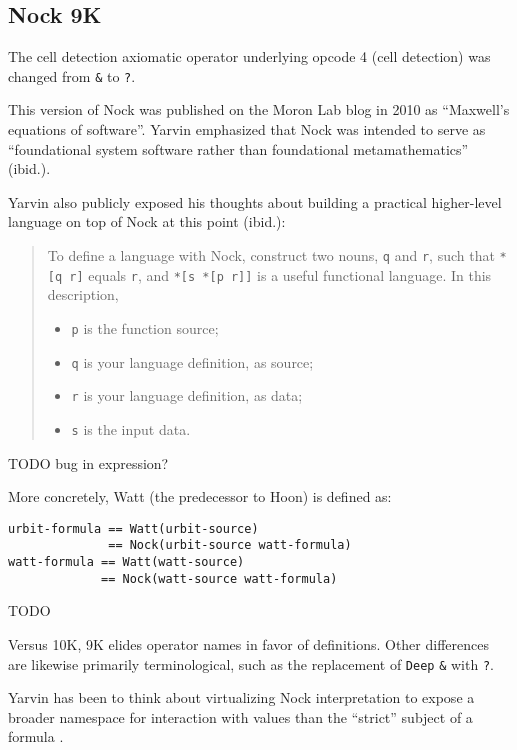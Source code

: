 \documentclass[twoside]{article}
\begin{document}
\subsection{Nock 9K}

The cell detection axiomatic operator underlying opcode 4 (cell detection) was changed from \texttt{\&} to \texttt{?}.

This version of Nock was published on the Moron Lab blog in 2010 \citep{Yarvin2010} as ``Maxwell's equations of software''.  Yarvin emphasized that Nock was intended to serve as ``foundational system software rather than foundational metamathematics'' (ibid.).

Yarvin also publicly exposed his thoughts about building a practical higher-level language on top of Nock at this point (ibid.):

\begin{quote}
To define a language with Nock, construct two nouns, \texttt{q} and \texttt{r}, such that \texttt{*[q r]} equals \texttt{r}, and \texttt{*[s *[p r]]} is a useful functional language. In this description,
\begin{itemize}
  \item  \texttt{p} is the function source;
  \item  \texttt{q} is your language definition, as source;
  \item  \texttt{r} is your language definition, as data;
  \item  \texttt{s} is the input data.
\end{itemize}
\end{quote}
TODO bug in expression?

More concretely, Watt (the predecessor to Hoon) is defined as:

\begin{lstlisting}[style=listingcode]
urbit-formula == Watt(urbit-source)
              == Nock(urbit-source watt-formula)
watt-formula == Watt(watt-source)
             == Nock(watt-source watt-formula)
\end{lstlisting}

\noindent
TODO

Versus 10K, 9K elides operator names in favor of definitions.  Other differences are likewise primarily terminological, such as the replacement of \texttt{Deep} \texttt{\&} with \texttt{?}.

Yarvin has been to think about virtualizing Nock interpretation to expose a broader namespace for interaction with values than the ``strict'' subject of a formula \citep{Yarvin2010}.
\end{document}
